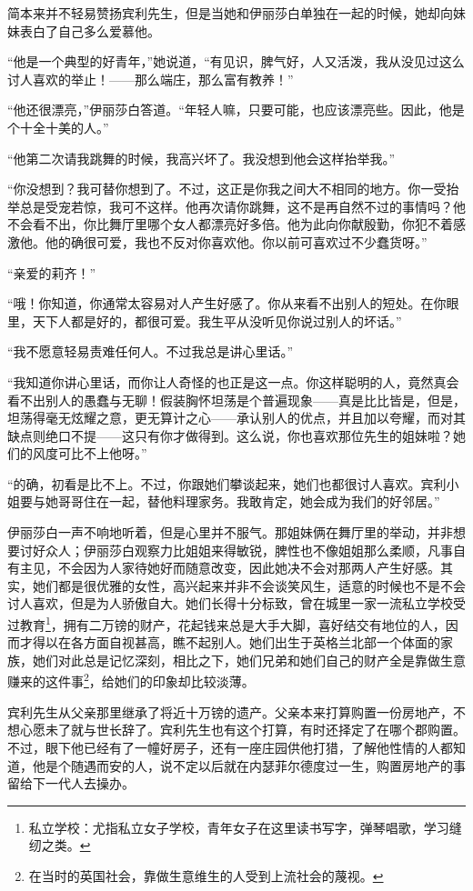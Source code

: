 \par 简本来并不轻易赞扬宾利先生，但是当她和伊丽莎白单独在一起的时候，她却向妹妹表白了自己多么爱慕他。
\par “他是一个典型的好青年，”她说道，“有见识，脾气好，人又活泼，我从没见过这么讨人喜欢的举止！——那么端庄，那么富有教养！”
\par “他还很漂亮，”伊丽莎白答道。“年轻人嘛，只要可能，也应该漂亮些。因此，他是个十全十美的人。”
\par “他第二次请我跳舞的时候，我高兴坏了。我没想到他会这样抬举我。”
\par “你没想到？我可替你想到了。不过，这正是你我之间大不相同的地方。你一受抬举总是受宠若惊，我可不这样。他再次请你跳舞，这不是再自然不过的事情吗？他不会看不出，你比舞厅里哪个女人都漂亮好多倍。他为此向你献殷勤，你犯不着感激他。他的确很可爱，我也不反对你喜欢他。你以前可喜欢过不少蠢货呀。”
\par “亲爱的莉齐！”
\par “哦！你知道，你通常太容易对人产生好感了。你从来看不出别人的短处。在你眼里，天下人都是好的，都很可爱。我生平从没听见你说过别人的坏话。”
\par “我不愿意轻易责难任何人。不过我总是讲心里话。”
\par “我知道你讲心里话，而你让人奇怪的也正是这一点。你这样聪明的人，竟然真会看不出别人的愚蠢与无聊！假装胸怀坦荡是个普遍现象——真是比比皆是，但是，坦荡得毫无炫耀之意，更无算计之心——承认别人的优点，并且加以夸耀，而对其缺点则绝口不提——这只有你才做得到。这么说，你也喜欢那位先生的姐妹啦？她们的风度可比不上他呀。”
\par “的确，初看是比不上。不过，你跟她们攀谈起来，她们也都很讨人喜欢。宾利小姐要与她哥哥住在一起，替他料理家务。我敢肯定，她会成为我们的好邻居。”
\par 伊丽莎白一声不响地听着，但是心里并不服气。那姐妹俩在舞厅里的举动，并非想要讨好众人；伊丽莎白观察力比姐姐来得敏锐，脾性也不像姐姐那么柔顺，凡事自有主见，不会因为人家待她好而随意改变，因此她决不会对那两人产生好感。其实，她们都是很优雅的女性，高兴起来并非不会谈笑风生，适意的时候也不是不会讨人喜欢，但是为人骄傲自大。她们长得十分标致，曾在城里一家一流私立学校受过教育\footnote{私立学校：尤指私立女子学校，青年女子在这里读书写字，弹琴唱歌，学习缝纫之类。}，拥有二万镑的财产，花起钱来总是大手大脚，喜好结交有地位的人，因而才得以在各方面自视甚高，瞧不起别人。她们出生于英格兰北部一个体面的家族，她们对此总是记忆深刻，相比之下，她们兄弟和她们自己的财产全是靠做生意赚来的这件事\footnote{在当时的英国社会，靠做生意维生的人受到上流社会的蔑视。}，给她们的印象却比较淡薄。
\par 宾利先生从父亲那里继承了将近十万镑的遗产。父亲本来打算购置一份房地产，不想心愿未了就与世长辞了。宾利先生也有这个打算，有时还择定了在哪个郡购置。不过，眼下他已经有了一幢好房子，还有一座庄园供他打猎，了解他性情的人都知道，他是个随遇而安的人，说不定以后就在内瑟菲尔德度过一生，购置房地产的事留给下一代人去操办。
